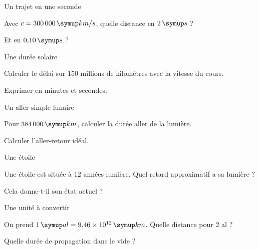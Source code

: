 \par\noindent\begin{minipage}{\linewidth}
\begin{exercice}[2]{Un trajet en une seconde}
\begin{questions}
\item Avec $c=300\,000\unite{km/s}$, quelle distance en $2\unite s$ ?
\item Et en $0{,}10\unite s$ ?
\end{questions}
\end{exercice}
\end{minipage}
\par\noindent\begin{minipage}{\linewidth}
\begin{exercice}[2]{Une durée solaire}
\begin{questions}
\item Calculer le délai sur $150$ millions de kilomètres avec la vitesse du cours.
\item Exprimer en minutes et secondes.
\end{questions}
\end{exercice}
\end{minipage}
\par\noindent\begin{minipage}{\linewidth}
\begin{exercice}[2]{Un aller simple lunaire}
\begin{questions}
\item Pour $384\,000\unite{km}$, calculer la durée aller de la lumière.
\item Calculer l’aller-retour idéal.
\end{questions}
\end{exercice}
\end{minipage}
\par\noindent\begin{minipage}{\linewidth}
\begin{exercice}[2]{Une étoile}
\begin{questions}
\item Une étoile est située à 12 années-lumière. Quel retard approximatif a sa lumière ?
\item Cela donne-t-il son état actuel ?
\end{questions}
\end{exercice}
\end{minipage}
\par\noindent\begin{minipage}{\linewidth}
\begin{exercice}[2]{Une unité à convertir}
\begin{questions}
\item On prend $1\unite{al}=9{,}46\times10^{12}\unite{km}$. Quelle distance pour 2 al ?
\item Quelle durée de propagation dans le vide ?
\end{questions}
\end{exercice}
\end{minipage}
